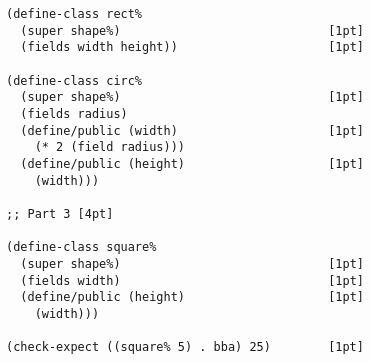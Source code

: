 \documentclass[12pt]{article}                   %
\newenvironment{solution}{}{}
\begin{document}
\begin{problem}
\begin{solution}
\begin{verbatim}
(define-class rect% 
  (super shape%)                             [1pt]
  (fields width height))                     [1pt]
  
(define-class circ% 
  (super shape%)                             [1pt]
  (fields radius)
  (define/public (width)                     [1pt]
    (* 2 (field radius)))
  (define/public (height)                    [1pt]
    (width)))

;; Part 3 [4pt]
    
(define-class square%
  (super shape%)                             [1pt]
  (fields width)                             [1pt]
  (define/public (height)                    [1pt]
    (width)))

(check-expect ((square% 5) . bba) 25)        [1pt]
\end{verbatim}
\end{solution}

\newpage
\ifrubric{}
\newpage
\fi

\end{problem}
\end{document}
